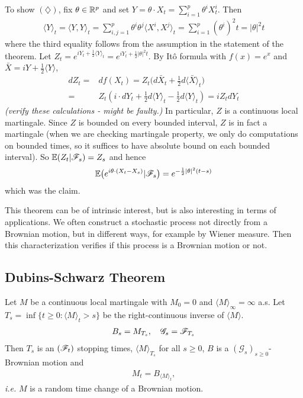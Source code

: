 \documentclass[12pt,a4paper]{article}
\newenvironment{proof}
{\begin{changemargin}{0.5cm}{0.5cm} 
	}%
	{\end{changemargin}
}
\newenvironment{p}
{\begin{proof} 
	}%
	{\end{proof}
}
\begin{document}
\begin{p}
To show $(\diamondsuit)$, fix $\theta \in \mathbb{R}^p$ and set $Y = \theta \cdot X_t = \sum_{i=1}^p \theta^i X_t^i$. Then
\begin{align*}
\langle Y \rangle_t = \langle Y , Y \rangle_t = \sum_{i,j=1}^p \theta^i \theta^j \langle X^i, X^j \rangle_t = \sum_{i=1}^p (\theta^i)^2 t = |\theta|^2 t
\end{align*}
where the third equality follows from the assumption in the statement of the theorem. Let $Z_t = e^{i Y_t + \frac{1}{2} \langle Y \rangle_t} = e^{iY_t + \frac{1}{2} |\theta|^2 t}$. By It\^o formula with $f(x) = e^x$ and $\bar{X}= iY + \frac{1}{2} \langle Y \rangle$,
\begin{align*}
dZ_t =& df(X_t) = Z_t \big( d\bar{X}_t + \frac{1}{2} d\langle \bar{X} \rangle_t \big) \\
=& Z_t (i \cdot dY_t + \frac{1}{2} d\langle Y \rangle_t - \frac{1}{2} d\langle Y \rangle_t) = iZ_t dY_t
\end{align*}
\emph{(verify these calculations - might be faulty.)} In particular, $Z$ is a continuous local martingale. Since $Z$ is bounded on every bounded interval, $Z$ is in fact a martingale (when we are checking martingale property, we only do computations on bounded times, so it suffices to have absolute bound on each bounded interval). So $\mathbb{E}(Z_t | \mathscr{F}_s) = Z_s$ and hence
\begin{align*}
\mathbb{E} \big( e^{i\theta \cdot (X_t - X_s)} | \mathscr{F}_s \big) = e^{-\frac{1}{2} |\theta|^2 (t-s)}
\end{align*}
which was the claim.

\eop
\end{p}
\s

This theorem can be of intrinsic interest, but is also interesting in terms of applications. We often construct a stochastic process not directly from a Brownian motion, but in different ways, for example by Wiener measure. Then this characterization verifies if this process is a Brownian motion or not.

\subsection{Dubins-Schwarz Theorem}

\thm Let $M$ be a continuous local martingale with $M_0 =0$ and $\langle M \rangle_{\infty} =\infty$ a.s. Let $T_s = \inf \{t\geq 0 : \langle M \rangle_t >s \}$ be the right-continuous inverse of $\langle M \rangle$.
\begin{align*}
B_s = M_{T_s}, \quad \mathscr{G}_s = \mathscr{F}_{T_s}
\end{align*}
Then $T_s$ is an $(\mathscr{F}_t)$ stopping times, $\langle M \rangle_{T_s}$ for all $s\geq 0$, $B$ is a $(\mathscr{G}_s)_{s\geq 0}$-Brownian motion and
\begin{align*}
M_t = B_{\langle M \rangle_t},
\end{align*}
\textit{i.e.} $M$ is a random time change of a Brownian motion.
\s
\end{document}
